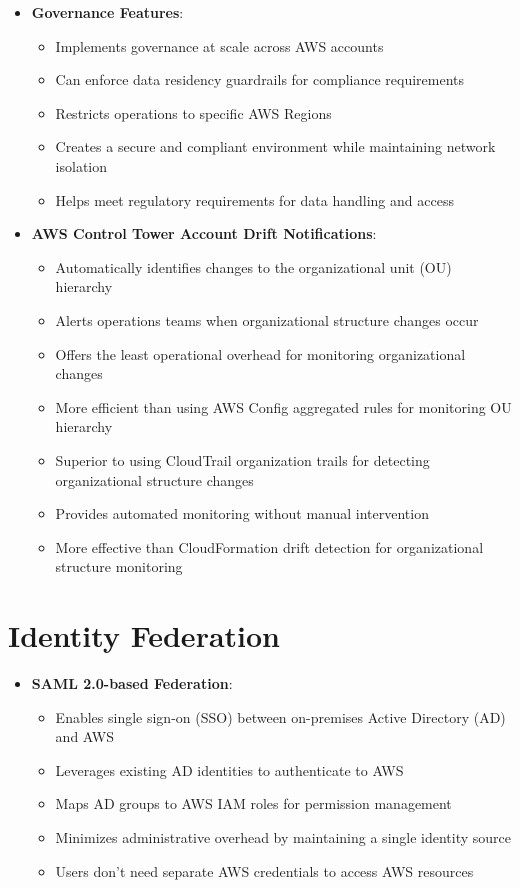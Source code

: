 \documentclass[11pt,a4paper]{report}
\begin{document}
\begin{itemize}
  \item \textbf{Governance Features}:
\begin{itemize}
  \item Implements governance at scale across AWS accounts
  \item Can enforce data residency guardrails for compliance requirements
  \item Restricts operations to specific AWS Regions
  \item Creates a secure and compliant environment while maintaining network isolation
  \item Helps meet regulatory requirements for data handling and access
\end{itemize}
  \item \textbf{AWS Control Tower Account Drift Notifications}:
\begin{itemize}
  \item Automatically identifies changes to the organizational unit (OU) hierarchy
  \item Alerts operations teams when organizational structure changes occur
  \item Offers the least operational overhead for monitoring organizational changes
  \item More efficient than using AWS Config aggregated rules for monitoring OU hierarchy
  \item Superior to using CloudTrail organization trails for detecting organizational structure changes
  \item Provides automated monitoring without manual intervention
  \item More effective than CloudFormation drift detection for organizational structure monitoring
\end{itemize}
\end{itemize}


\section{Identity Federation}

\begin{itemize}
  \item \textbf{SAML 2.0-based Federation}:
\begin{itemize}
  \item Enables single sign-on (SSO) between on-premises Active Directory (AD) and AWS
  \item Leverages existing AD identities to authenticate to AWS
  \item Maps AD groups to AWS IAM roles for permission management
  \item Minimizes administrative overhead by maintaining a single identity source
  \item Users don't need separate AWS credentials to access AWS resources
\end{itemize}
\end{itemize}
\end{document}
